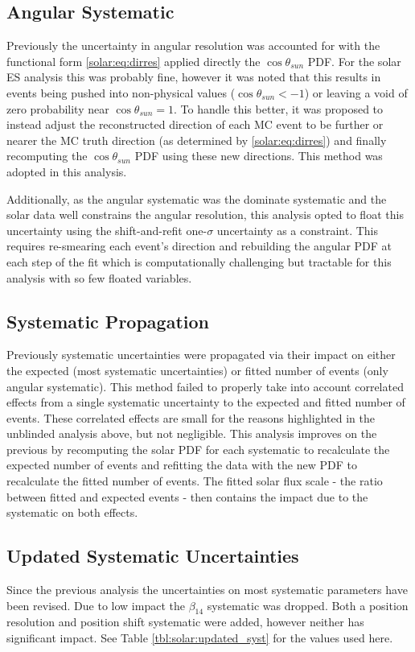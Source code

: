\subsection{Angular Systematic}
Previously the uncertainty in angular resolution was accounted for with the functional form  \ref{solar:eq:dirres} applied directly the $\cos \theta_{sun}$ PDF. 
For the solar ES analysis this was probably fine, however it was noted that this results in events being pushed into non-physical values ($\cos \theta_{sun} < -1$) or leaving a void of zero probability near $\cos \theta_{sun} = 1$.
To handle this better, it was proposed to instead adjust the reconstructed direction of each MC event to be further or nearer the MC truth direction (as determined by  \ref{solar:eq:dirres}) and finally recomputing the $\cos \theta_{sun}$ PDF using these new directions.
This method was adopted in this analysis.

Additionally, as the angular systematic was the dominate systematic and the solar data well constrains the angular resolution, this analysis opted to float this uncertainty using the shift-and-refit one-$\sigma$ uncertainty as a constraint.
This requires re-smearing each event's direction and rebuilding the angular PDF at each step of the fit which is computationally challenging but tractable for this analysis with so few floated variables.

\subsection{Systematic Propagation}
Previously systematic uncertainties were propagated via their impact on either the expected (most systematic uncertainties) or fitted number of events (only angular systematic). 
This method failed to properly take into account correlated effects from a single systematic uncertainty to the expected and fitted number of events.
These correlated effects are small for the reasons highlighted in the unblinded analysis above, but not negligible.
This analysis improves on the previous by recomputing the solar PDF for each systematic to recalculate the expected number of events and refitting the data with the new PDF to recalculate the fitted number of events.
The fitted solar flux scale - the ratio between fitted and expected events - then contains the impact due to the systematic on both effects.

\subsection{Updated Systematic Uncertainties}
Since the previous analysis the uncertainties on most systematic parameters have been revised. 
Due to low impact the $\beta_{14}$ systematic was dropped.
Both a position resolution and position shift systematic were added, however neither has significant impact.
See Table \ref{tbl:solar:updated_syst} for the values used here.

